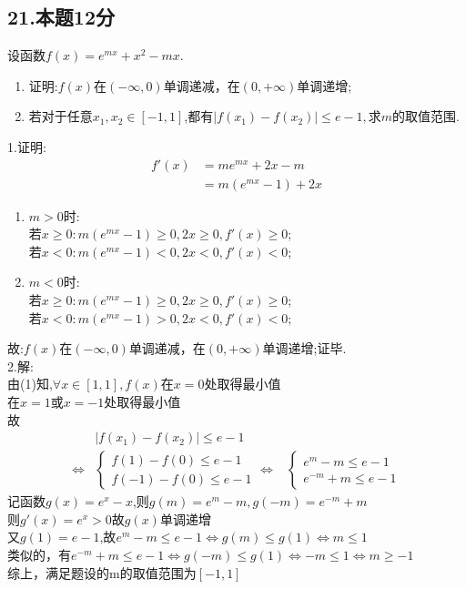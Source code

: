 \documentclass[UTF8]{ctexart}
\begin{document}
\subsection{21.本题12分}
设函数$f(x)=e^{mx}+x^2-mx.$\\
\begin{enumerate}
    \item 证明:$f(x)$在$(-\infty,0)$单调递减，在$(0,+\infty)$单调递增;
    \item 若对于任意$x_1,x_2\in [-1,1]$,都有$|f(x_1)-f(x_2)|\leq e-1,$求$m$的取值范围.
\end{enumerate}
1.证明:\\
\[
\begin{aligned}
    f'(x)&=me^{mx}+2x-m\\
    &=m(e^{mx}-1)+2x
\end{aligned}\]
\begin{enumerate}
    \item $m> 0$时:\\
    若$x\geq 0:m(e^{mx}-1)\geq 0,2x\geq 0,f'(x)\geq 0$;\\
    若$x<0:m(e^{mx}-1)<0,2x<0,f'(x)<0$;\\
    \item $m<0$时:\\
    若$x\geq 0:m(e^{mx}-1)\geq 0,2x\geq 0,f'(x)\geq 0$;\\
    若$x<0:m(e^{mx}-1)>0,2x<0,f'(x)<0$;\\
\end{enumerate}
故:$f(x)$在$(-\infty,0)$单调递减，在$(0,+\infty)$单调递增;证毕.\\
2.解:\\
由(1)知,$\forall x \in [1,1],f(x)$在$x=0$处取得最小值\\
在$x=1$或$x=-1$处取得最小值\\
故\[
\begin{aligned}
    &|f(x_1)-f(x_2)|\leq e-1\\
    \Leftrightarrow &\left\{
        \begin{aligned}
            f(1)-f(0)\leq e-1\\
            f(-1)-f(0)\leq e-1
        \end{aligned}
    \right.
    \Leftrightarrow &\left\{
        \begin{aligned}
            e^m-m\leq e-1\\
            e^{-m}+m\leq e-1
        \end{aligned}
    \right.
\end{aligned}\]
记函数$g(x)=e^x-x$,则$g(m)=e^m-m,g(-m)=e^{-m}+m$\\
则$g'(x)=e^x>0$故$g(x)$单调递增\\
又$g(1)=e-1$,故$e^m-m\leq e-1 \Leftrightarrow g(m)\leq g(1)\Leftrightarrow m\leq 1$\\
类似的，有$e^{-m}+m\leq e-1 \Leftrightarrow g(-m)\leq g(1)
\Leftrightarrow -m\leq 1 \Leftrightarrow m\geq -1$\\
综上，满足题设的m的取值范围为$[-1,1]$
\end{document}
